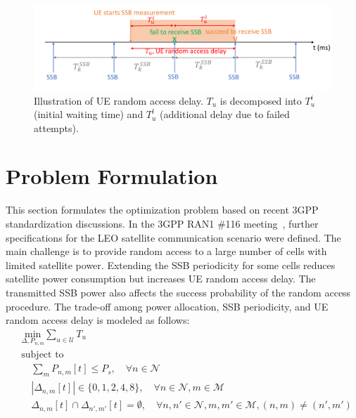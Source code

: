 \begin{figure}[h!]
    \centering
    \includegraphics[width=1\textwidth]{figure/random access delay.pdf}
    \caption{Illustration of UE random access delay. $T_u$ is decomposed into $T_u^i$ (initial waiting time) and $T_u^l$ (additional delay due to failed attempts).}
    \label{RAD}
\end{figure}

\section{Problem Formulation}
This section formulates the optimization problem based on recent 3GPP standardization discussions. In the 3GPP RAN1 \#116 meeting~\cite{ran1-116}, further specifications for the LEO satellite communication scenario were defined. The main challenge is to provide random access to a large number of cells with limited satellite power. Extending the SSB periodicity for some cells reduces satellite power consumption but increases UE random access delay. The transmitted SSB power also affects the success probability of the random access procedure. The trade-off among power allocation, SSB periodicity, and UE random access delay is modeled as follows:
\begin{equation}
\begin{aligned}
    & \underset{\Delta, P_{n, m}}{\text{min}} \sum_{u \in \mathcal{U}} T_u \\
    & \text{subject to} \\
    & \quad \sum_{m} P_{n,m}[t] \leq P_s, \quad \forall n \in \mathcal{N} \\
    & \quad |\Delta_{n, m}[t]| \in \{0, 1, 2, 4, 8\}, \quad \forall n \in \mathcal{N}, m \in \mathcal{M} \\
    & \quad \Delta_{n, m}[t] \cap \Delta_{n', m'}[t] = \emptyset, \quad \forall n, n' \in \mathcal{N}, m, m' \in \mathcal{M}, (n, m) \neq (n', m')
\end{aligned}
\end{equation}

